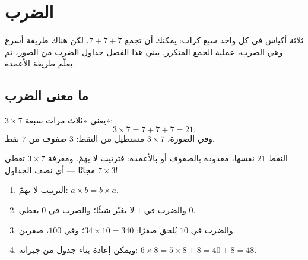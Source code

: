 \chapter{الضرب}\label{ch:g3:mult}

ثلاثة أكياس في كل واحد سبع كرات: يمكنك أن تجمع $7 + 7 + 7$، لكن
هناك طريقة أسرع --- وهي الضرب، عملية الجمع المتكرر. يبني هذا
الفصل جداول الضرب من الصور، ثم يعلّم طريقة
الأعمدة.

\section{ما معنى الضرب}

\begin{definition}[الضرب]\label{def:g3:mult:def}
 $3 \times 7$ يعني «ثلاث مرات سبعة»:
\[
3 \times 7 = 7 + 7 + 7 = 21 .
\]
وفي الصورة، $3 \times 7$ مستطيل من النقط: $3$ صفوف من $7$
نقط.
\end{definition}

\begin{omfigure}

{\small النقط $21$ نفسها، معدودة بالصفوف أو بالأعمدة: فترتيب
 لا يهمّ. ومعرفة $3 \times 7$ تعطي
$7 \times 3$ مجانًا --- أي نصف الجداول!}
\end{omfigure}

\begin{proposition}\label{prop:g3:mult:rules}
\begin{enumerate}
  \item الترتيب لا يهمّ: $a \times b = b \times a$.
  \item والضرب في $1$ لا يغيّر شيئًا؛ والضرب في $0$ يعطي
        $0$.
  \item والضرب في $10$ يُلحق صفرًا: $34 \times 10 = 340$؛
        وفي $100$، صفرين.
  \item ويمكن إعادة بناء جدول من جيرانه:
        $6 \times 8 = 5 \times 8 + 8 = 40 + 8 = 48$.
\end{enumerate}
\end{proposition}
\admitted

